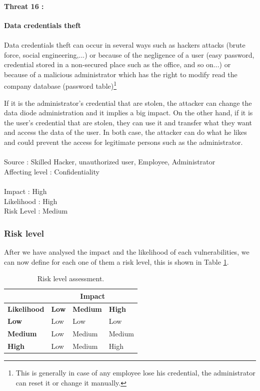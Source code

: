 \documentclass[a4paper,10pt]{article}
\begin{document}
\paragraph{Threat 16 :} \textbf{Data credentials theft} 
\paragraph{}Data credentials theft can occur in several ways such as hackers attacks (brute force, social engineering,...)  or because of the negligence of a user (easy password, credential stored in a non-secured place such as the office, and so on...) or because of a malicious administrator which has the right to modify  read the company database (password table)\footnote{This is generally in case of any employee lose his credential, the administrator can reset it or change it manually.}

If it is the administrator's credential that are stolen, the attacker can change the data diode administration and it implies a big impact. On the other hand, if it is the user's credential that are stolen, they can use it and transfer what they want and access the data of the user. In both case, the attacker can do what he likes and could prevent the access for legitimate persons such as the administrator. \\ \\ 
Source : Skilled Hacker, unauthorized user, Employee, Administrator \\
Affecting level : Confidentiality \\ \\
Impact : High \\
Likelihood : High \\
Risk Level : Medium


\subsubsection{Risk level}

After we have analysed the impact and the likelihood of each vulnerabilities, we can now define for each one of them a risk level, this is shown in Table \ref{tab:risk}.

\begin{table}[!h]
	\centering
	\begin{tabular}{|l|l|l|l|}
		\hline
		 & \multicolumn{3}{|c|}{\textbf{Impact}}  \\ \hline
		\textbf{Likelihood} & \textbf{Low} & \textbf{Medium} & \textbf{High} \\ \hline
		\textbf{Low}& Low & Low & Low \\ \hline
		\textbf{Medium} & Low & Medium & Medium \\ \hline
		\textbf{High} & Low & Medium &  High \\ \hline
	\end{tabular}
	\caption{Risk level assessment.}
	\label{tab:risk}
\end{table} 
\end{document}
